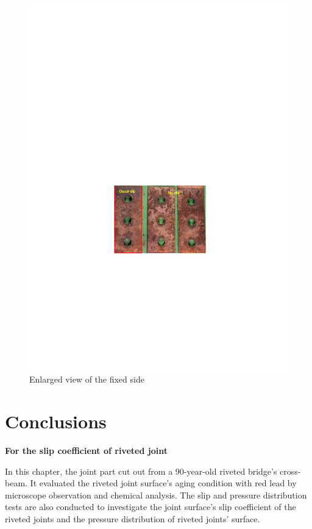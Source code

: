 \begin{figure}[htbp]
\begin{minipage}[t]{0.45\textwidth}
    \includegraphics[width=\linewidth]{imgs/ch3/fig3-30.pdf}
    \caption{Enlarged view of the fixed side}
    \label{fig3-30}
    \end{minipage}
\end{figure} 





\section{Conclusions}

\textbf{For the slip coefficient of riveted joint }

In this chapter, the joint part cut out from a 90-year-old riveted bridge's cross-beam. It evaluated the riveted joint surface's aging condition with red lead by microscope observation and chemical analysis. The slip and pressure distribution tests are also conducted to investigate the joint surface's slip coefficient of the riveted joints and the pressure distribution of riveted joints' surface. 

